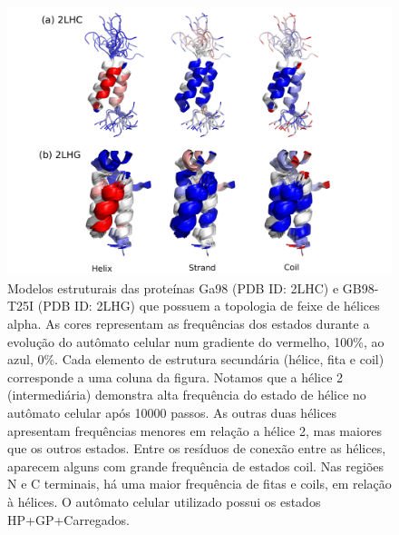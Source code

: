 \begin{figure}
  \centering
  \includegraphics[width=1\textwidth]{figures/camel_2lhc_2lhg.pdf}
  \caption{Modelos estruturais das proteínas Ga98 (PDB ID: 2LHC) e GB98-T25I (PDB ID: 2LHG) que possuem a topologia de feixe de hélices alpha. As cores representam as frequências dos estados durante a evolução do autômato celular num gradiente do vermelho, 100\%, ao azul, 0\%. Cada elemento de estrutura secundária (hélice, fita e coil) corresponde a uma coluna da figura. Notamos que a hélice 2 (intermediária) demonstra alta frequência do estado de hélice no autômato celular após 10000 passos. As outras duas hélices apresentam frequências menores em relação a hélice 2, mas maiores que os outros estados. Entre os resíduos de conexão entre as hélices, aparecem alguns com grande frequência de estados coil. Nas regiões N e C terminais, há uma maior frequência de fitas e coils, em relação à hélices. O autômato celular utilizado possui os estados HP+GP+Carregados.}
        \label{fig:camel_2lhc_2lhg}
\end{figure}

